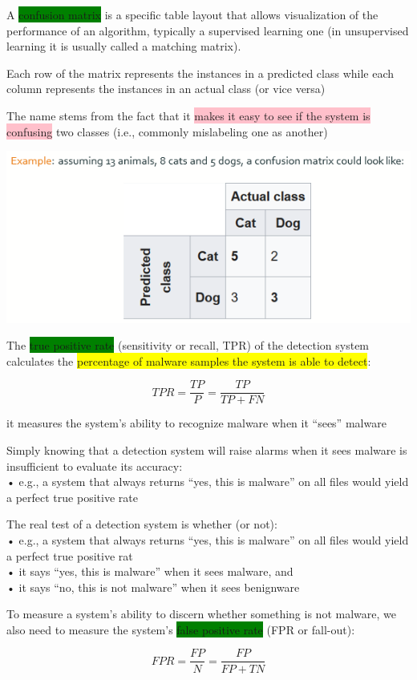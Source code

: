 \documentclass[]{project_plan}
\begin{document}
A \colorbox{green}{confusion matrix} is a specific table layout that allows visualization of the
performance of an algorithm, typically a supervised learning one (in unsupervised
learning it is usually called a matching matrix).

Each row of the matrix represents the instances in a predicted class while each
column represents the instances in an actual class (or vice versa)

The name stems from the fact that it \colorbox{pink}{makes it easy to see if the system is
  confusing} two classes (i.e., commonly mislabeling one as another)

\includegraphics[width=.6\linewidth]{ml99.png}

The \colorbox{green}{true positive rate} (sensitivity or recall, TPR) of the detection system calculates the \colorbox{yellow}{percentage of malware samples the system is able to detect}:

\[
  TPR = \frac{TP}{P} = \frac{TP}{TP + FN}
\]

it measures the system’s ability to recognize malware when it “sees” malware

Simply knowing that a detection system will raise alarms when it sees malware is insufficient to evaluate its accuracy:\\
• e.g., a system that always returns “yes, this is malware” on all files would yield a perfect true positive rate

The real test of a detection system is whether (or not):\\
• e.g., a system that always returns “yes, this is malware” on all files would yield a perfect true positive rat\\
• it says “yes, this is malware” when it sees malware, and\\
• it says “no, this is not malware” when it sees benignware

To measure a system’s ability to discern whether something is not malware, we also need to measure the system’s \colorbox{green}{false positive rate} (FPR or fall-out):

\[
  FPR = \frac{FP}{N} = \frac{FP}{FP + TN}
\]
\end{document}
